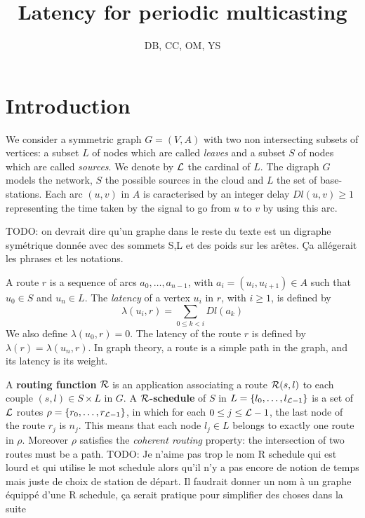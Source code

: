 \documentclass{article}
\begin{document}
\graphicspath{{figures/}}
\newtheorem{rem}{Remarque}
\newtheorem{proposition}{Proposition}
\newtheorem{theorem}{Theorem}
\newtheorem{fact}{Fact}
\newtheorem{lemma}[theorem]{Lemma}
\newtheorem{definition}{Definition}

\title{Latency for periodic multicasting}

\newcommand{\todo}[1]{}
\renewcommand{\todo}[1]{{\color{red} TODO: {#1}}}
 
\author{DB, CC, OM, YS}


\maketitle

 
\section{Introduction} 
We consider a symmetric graph $G=(V,A)$ with two non intersecting subsets of vertices: a subset $L$ of nodes which are called \emph{leaves} and a subset $S$ of nodes which are called \emph{sources}.  We denote by ${\cal L}$ the cardinal of $L$. The digraph $G$ models the network, $S$ the possible sources in the cloud and $L$ the set of base-stations.
Each arc  $(u,v)$ in $A$ is caracterised by an integer delay $Dl(u,v) \geq 1$ representing the time taken by the signal to go from $u$ to $v$
by using this arc.  


\todo{on devrait dire qu'un graphe dans le reste du texte est un digraphe symétrique donnée avec des sommets S,L et des poids sur les arêtes. Ça allégerait les phrases et les notations.} 

A route $r$ is a sequence of arcs $a_0, \ldots , a_{n-1}$, with $a_i=(u_i,u_{i+1}) \in A$ such that $u_0 \in S$ and $u_n \in L$. The {\em latency} of a vertex $u_i$ in $r$, with $i \geq 1$, is defined by $$\lambda(u_i,r)= \sum\limits_{0 \leq k <i} Dl(a_k)$$ We also define $\lambda(u_0,r)=0$. The latency of the route $r$ is defined by $\lambda (r)= \lambda (u_n,r)$. In graph theory, a route is a simple path in the graph, and its latency is its weight. 

A {\bf routing function} ${\cal R}$ is an application associating a route ${\cal R}(s,l)$ to each couple $(s,l) \in S \times L$ in $G$. A {\bf ${\cal R}$-schedule} of $S$ in $L=\{l_0, \ldots , l_{{\cal L}-1}\}$ is a set of ${\cal L}$ routes $\rho =\{r_0, \ldots ,r_{{\cal L}-1}\}$, in which for each $0 \leq j \leq {\cal L}-1$, the last node of the route $r_j$ is $n_j$. This means that each node $l_j \in L$ belongs to exactly one route in $\rho$.
Moreover $\rho$ satisfies the \emph{coherent routing} property: the intersection of two routes must be a path.
\todo{Je n'aime pas trop le nom R schedule qui est lourd et qui utilise le mot schedule alors qu'il n'y a pas encore de notion de temps mais juste de choix de station de départ.
Il faudrait donner un nom à un graphe équippé d'une R schedule, ça serait pratique pour simplifier des choses dans la suite}
\end{document}
